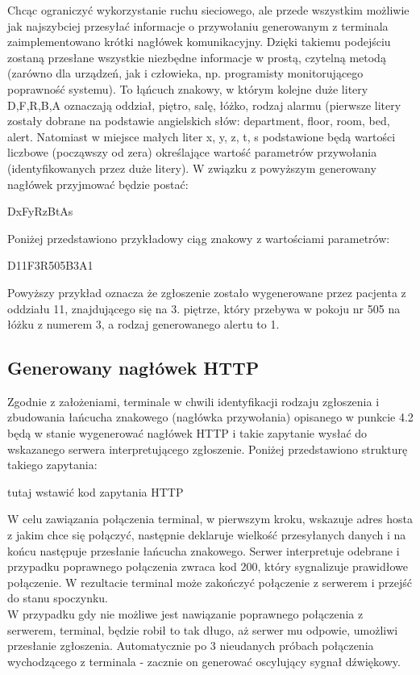 \documentclass[12pt]{article} %
\begin{document}
Chcąc ograniczyć wykorzystanie ruchu sieciowego, ale przede wszystkim możliwie jak najszybciej przesyłać informacje o przywołaniu generowanym z terminala zaimplementowano krótki nagłówek komunikacyjny. Dzięki takiemu podejściu zostaną przesłane wszystkie niezbędne informacje w prostą, czytelną metodą (zarówno dla urządzeń, jak i człowieka, np. programisty monitorującego poprawność systemu). To łąńcuch znakowy, w którym kolejne duże litery D,F,R,B,A oznaczają oddział, piętro, salę, łóżko, rodzaj alarmu (pierwsze litery zostały dobrane na podstawie angielskich słów: department, floor, room, bed, alert. Natomiast w miejsce małych liter x, y, z, t, s podstawione będą wartości liczbowe (począwszy od zera) określające wartość parametrów przywołania (identyfikowanych przez duże litery). W związku z powyższym generowany nagłówek przyjmować będzie postać:
\begin{center}
DxFyRzBtAs
\end{center}
Poniżej przedstawiono przykładowy ciąg znakowy z wartościami parametrów:

\begin{center}
D11F3R505B3A1
\end{center}
Powyższy przykład oznacza że zgłoszenie zostało wygenerowane przez pacjenta z oddziału 11, znajdującego się na 3. piętrze, który przebywa w pokoju nr 505 na łóżku z numerem 3, a rodzaj  generowanego alertu to 1.

\subsection{Generowany nagłówek HTTP}

Zgodnie z założeniami, terminale w chwili identyfikacji rodzaju zgłoszenia i zbudowania łańcucha znakowego (nagłówka przywołania) opisanego w punkcie 4.2 będą w stanie wygenerować nagłówek HTTP i takie zapytanie wysłać do wskazanego serwera interpretującego zgłoszenie. Poniżej przedstawiono strukturę takiego zapytania:

\begin{center}
tutaj wstawić kod zapytania HTTP
\end{center}

W celu zawiązania połączenia terminal, w pierwszym kroku, wskazuje adres hosta z jakim chce się połączyć, następnie deklaruje wielkość przesyłanych danych i na końcu następuje przesłanie łańcucha znakowego. Serwer interpretuje odebrane i przypadku poprawnego połączenia zwraca kod 200, który sygnalizuje prawidłowe połączenie. W rezultacie terminal może zakończyć połączenie z serwerem i przejść do stanu spoczynku.
\\
W przypadku gdy nie możliwe jest nawiązanie poprawnego połączenia z serwerem, terminal, będzie robił to tak długo, aż serwer mu odpowie, umożliwi przesłanie zgłoszenia. Automatycznie po 3 nieudanych próbach połączenia wychodzącego z terminala - zacznie on generować oscylujący sygnał dźwiękowy.
\end{document}

